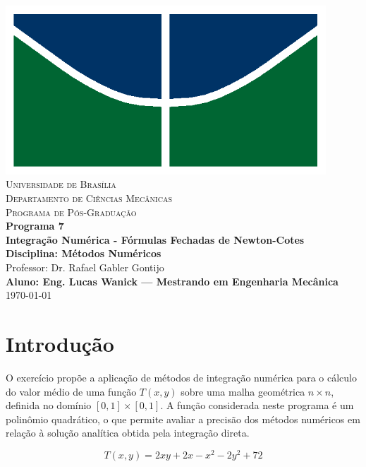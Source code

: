 \documentclass[12pt]{article}
\begin{document}
\begin{titlepage}
    \centering
    \includegraphics[width=12cm]{img/unb_bandeira.png} \\
    \vspace{1cm}
    \textsc{\Large Universidade de Bras\'ilia} \\
    \textsc{Departamento de Ciências Mec\^anicas} \\
    \textsc{Programa de P\'os-Gradua\c{c}\~ao} \\
    \vfill
    {\Large\bfseries Programa 7} \\
    \vspace{0.5cm}
    {\Large\bfseries Integração Numérica - Fórmulas Fechadas de Newton-Cotes} \\
    \vspace{0.5cm}
    \textbf{Disciplina: M\'etodos Num\'ericos} \\
    Professor: Dr. Rafael Gabler Gontijo \\
    \vfill
    \textbf{Aluno: Eng. Lucas Wanick — Mestrando em Engenharia Mec\^anica} \\
    \vspace{0.5cm}
        \today \\
\end{titlepage}


\section{Introdução}
O exercício propõe a aplicação de métodos de integração numérica para o cálculo do valor médio de uma função $T(x,y)$ sobre uma malha geométrica $n \times n$, definida no domínio $[0,1]\times[0,1]$. A função considerada neste programa é um polinômio quadrático, o que permite avaliar a precisão dos métodos numéricos em relação à solução analítica obtida pela integração direta.

\begin{equation}
    T(x,y) = 2xy + 2x - x^2 - 2y^2 + 72
\end{equation}
\end{document}
